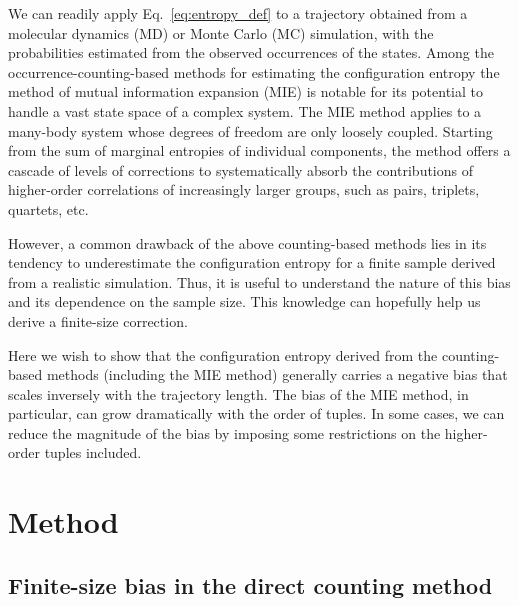 \documentclass[reprint, superscriptaddress]{revtex4-1}
\begin{document}
We can readily apply Eq.~\eqref{eq:entropy_def} to a trajectory
obtained from a molecular dynamics (MD) or Monte Carlo (MC) simulation,
with the probabilities estimated from the observed occurrences of the states.
%
Among the occurrence-counting-based methods for estimating the configuration entropy
the method of mutual information expansion (MIE) is notable
for its potential to handle a vast state space of a complex system.
%
The MIE method applies to a many-body system
whose degrees of freedom are only loosely coupled.
%
Starting from the sum of marginal entropies of individual components,
the method offers a cascade of levels of corrections
to systematically absorb the contributions of higher-order correlations
of increasingly larger groups, such as pairs, triplets, quartets, etc.

However, a common drawback of the above counting-based methods
lies in its tendency to underestimate the configuration entropy for a finite sample
derived from a realistic simulation.
%
Thus, it is useful to understand the nature of this bias
and its dependence on the sample size.
%
This knowledge can hopefully help us derive a finite-size correction.

Here we wish to show that the configuration entropy derived
from the counting-based methods (including the MIE method)
generally carries a negative bias that scales inversely with the trajectory length.
%
The bias of the MIE method, in particular,
can grow dramatically with the order of tuples.
%
In some cases, we can reduce the magnitude of the bias
by imposing some restrictions on the higher-order tuples included.

\section{Method}

\subsection{\label{sec:fsbias}
Finite-size bias in the direct counting method}
\end{document}
